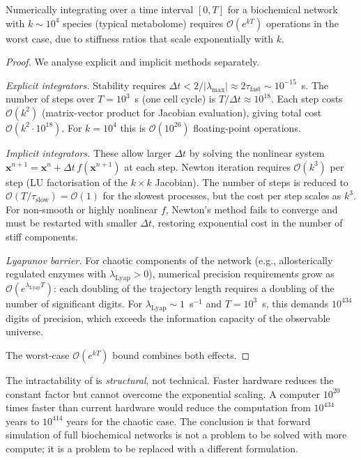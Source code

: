 \begin{theorem}
\label{thm:intractability}
Numerically integrating  over a time interval $[0,T]$ for a
biochemical network with $k \sim 10^4$ species (typical metabolome) requires
$\mathcal{O}(e^{kT})$ operations in the worst case, due to stiffness ratios
that scale exponentially with $k$.
\end{theorem}

\begin{proof}
We analyse explicit and implicit methods separately.

\emph{Explicit integrators.}  Stability requires $\Delta t < 2/|\lambda_\mathrm{max}|
\approx 2\tau_\mathrm{fast} \sim 10^{-15}$~s.  The number of steps over
$T = 10^3$~s (one cell cycle) is $T/\Delta t \approx 10^{18}$.  Each step
costs $\mathcal{O}(k^2)$ (matrix-vector product for Jacobian evaluation), giving
total cost $\mathcal{O}(k^2 \cdot 10^{18})$.  For $k = 10^4$ this is
$\mathcal{O}(10^{26})$ floating-point operations.

\emph{Implicit integrators.}  These allow larger $\Delta t$ by solving the
nonlinear system $\mathbf{x}^{n+1} = \mathbf{x}^n + \Delta t\,f(\mathbf{x}^{n+1})$
at each step.  Newton iteration requires $\mathcal{O}(k^3)$ per step (LU
factorisation of the $k\times k$ Jacobian).  The number of steps is reduced to
$\mathcal{O}(T/\tau_\mathrm{slow}) = \mathcal{O}(1)$ for the slowest processes,
but the cost per step scales as $k^3$.  For non-smooth or highly nonlinear $f$,
Newton's method fails to converge and must be restarted with smaller $\Delta t$,
restoring exponential cost in the number of stiff components.

\emph{Lyapunov barrier.}  For chaotic components of the network (e.g.,
allosterically regulated enzymes with $\lambda_\mathrm{Lyap} > 0$), numerical
precision requirements grow as $\mathcal{O}(e^{\lambda_\mathrm{Lyap} T})$:
each doubling of the trajectory length requires a doubling of the number of
significant digits.  For $\lambda_\mathrm{Lyap} \sim 1$~s$^{-1}$ and
$T = 10^3$~s, this demands $10^{434}$ digits of precision, which exceeds the
information capacity of the observable universe.

The worst-case $\mathcal{O}(e^{kT})$ bound combines both effects.
\end{proof}

\begin{remark}
The intractability of  is \emph{structural}, not
technical.  Faster hardware reduces the constant factor but cannot overcome
the exponential scaling.  A computer $10^{20}$ times faster than current
hardware would reduce the computation from $10^{434}$ years to $10^{414}$
years for the chaotic case.  The conclusion is that forward simulation of
full biochemical networks is not a problem to be solved with more compute; it
is a problem to be replaced with a different formulation.
\end{remark}

